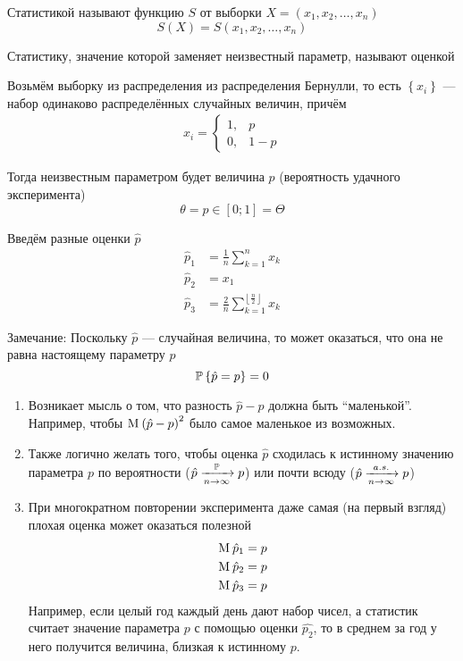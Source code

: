 \begin{definition}[Статистика]
Статистикой называют функцию $S$ от выборки $X=\left(x_1,x_2,\dots,x_n\right)$
    $$S\left(X\right)=S\left(x_1, x_2, \dots, x_n\right)$$
\end{definition}
\begin{definition}[Оценка]Статистику,
    значение которой заменяет неизвестный параметр,
    называют оценкой
\end{definition}
\begin{example}\label{example:bernulliEstimator}
    Возьмём выборку из распределения из распределения Бернулли,
    то есть $\left\{x_i\right\}$ --- набор одинаково распределённых
    случайных величин, причём
    \begin{align*}
    x_i=
    \begin{cases}
        1,&p\\
        0,&1-p
    \end{cases}
    \end{align*}

    Тогда неизвестным параметром будет величина $p$
    (вероятность удачного эксперимента)
    $$\theta=p\in\left[0;1\right]=\Theta$$

    Введём разные оценки $\hat{p}$
    \begin{align*}
        \hat{p}_1&=\frac{1}{n}\sum_{k=1}^n x_k\\
        \hat{p}_2&=x_1\\
        \hat{p}_3&=
            \frac{2}{n}\sum_{k=1}^{\left\lfloor \frac{n}{2} \right\rfloor} x_k
    \end{align*}
\end{example}
Замечание:
Поскольку $\hat{p}$ --- случайная величина, то может оказаться,
что она не равна настоящему параметру $p$
$$\mathbb{P}\left\{ \hat{p}=p \right\}=0$$
\begin{enumerate}
    \item Возникает мысль о том, что разность $\hat{p}-p$
        должна быть ``маленькой''. Например, чтобы
        $\operatorname{M}_{} \left(\hat{p}-p\right)^2$ было самое маленькое из возможных.
    \item Также логично желать того,
        чтобы оценка $\hat{p}$ сходилась к истинному значению параметра $p$
        по вероятности ($\hat{p}\xrightarrow[n\to\infty]{\mathbb{P}} p$)
        или почти всюду ($\hat{p}\xrightarrow[n\to\infty]{a.s.} p$)
    \item При многократном повторении эксперимента
        даже самая (на первый взгляд) плохая оценка может оказаться полезной
        \begin{align*}
            \operatorname{M}_{} \hat{p}_1=p\\
            \operatorname{M}_{} \hat{p}_2=p\\
            \operatorname{M}_{} \hat{p}_3=p
        \end{align*}
        Например, если целый год каждый день дают набор чисел,
        а статистик считает значение параметра $p$ с помощью оценки $\hat{p_2}$,
        то в среднем за год у него получится величина, близкая к истинному $p$.
\end{enumerate}

